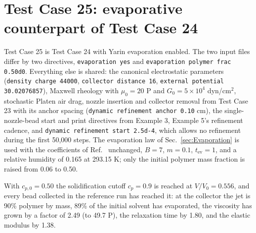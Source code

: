 \section{Test Case 25: evaporative counterpart of Test Case 24\label{sec:Test-Case-25}}

{\sloppy
Test Case 25 is Test Case 24 with Yarin evaporation enabled.  The two input
files differ by two directives, \texttt{evaporation yes} and
\texttt{evaporation polymer frac 0.50d0}.  Everything else is shared: the
canonical electrostatic parameters (\texttt{density charge 44000},
\texttt{collector distance 16}, \texttt{external potential 30.02076857}),
Maxwell rheology with $\mu_0=20$ P and $G_0=5\times10^{4}$ dyn/cm$^{2}$,
stochastic Platen air drag, nozzle insertion and collector removal from Test
Case 23 with its anchor spacing (\texttt{dynamic refinement anchor 0.10} cm),
the single-nozzle-bead start and print directives from Example 3,
Example 5's refinement cadence, and \texttt{dynamic refinement start 2.5d-4},
which allows no refinement during the first 50,000 steps.  The evaporation
law of Sec.~\ref{sec:Evaporation} is used with the coefficients of
Ref.~\cite{yarin2001bending} unchanged, $B=7$, $m=0.1$, $t_{\mathrm{ev}}=1$,
and a relative humidity of 0.165 at 293.15 K; only the initial polymer mass
fraction is raised from 0.06 to 0.50.\par}

With $c_{p,0}=0.50$ the solidification cutoff $c_p=0.9$ is reached at
$V/V_0=0.556$, and every bead collected in the reference run has reached it:
at the collector the jet is 90\% polymer by mass, 89\% of the initial solvent
has evaporated, the viscosity has grown by a factor of 2.49 (to 49.7 P), the
relaxation time by 1.80, and the elastic modulus by 1.38.

